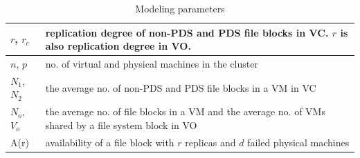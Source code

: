 \begin{table}[htbp]
\small
\centering
\begin{tabular}{|p{1.0cm}|p{5.75cm}|}
\hline
$r$, $r_c$ & replication degree of non-PDS and PDS file blocks in VC. $r$ is also replication degree in VO.\\
\hline
$n$, $p$ & no. of virtual and physical machines in the cluster\\
\hline
$N_1$, $N_2$ & the average no.  of non-PDS and PDS file blocks in a VM in VC\\
\hline
$N_o$, $V_o$ & the average no.  of file blocks  in a VM and the average no. of VMs shared by a file system block in VO\\
\hline
A(r) & availability of a file block with $r$ replicas and $d$ failed physical machines\\
\hline
\end{tabular}
\caption{Modeling  parameters}
\label{tab:symbol}
\end{table}



